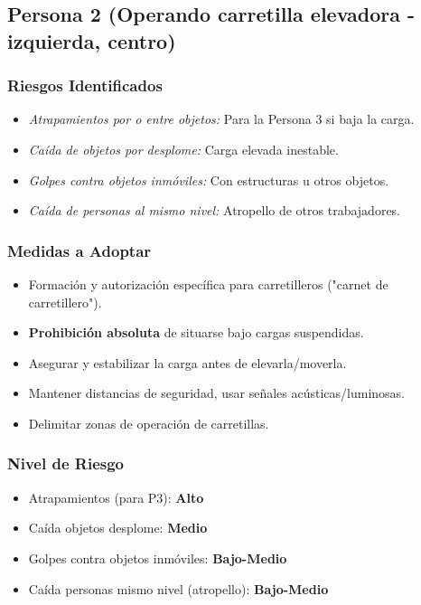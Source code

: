 \documentclass[12pt,a4paper]{article}
\begin{document}
	\bigskip\hrulefill\bigskip
	
	\subsection{Persona 2 (Operando carretilla elevadora - izquierda, centro)}
	
	\subsubsection{Riesgos Identificados}
	\begin{itemize}
		\item \textit{Atrapamientos por o entre objetos:} Para la Persona 3 si baja la carga.
		\item \textit{Caída de objetos por desplome:} Carga elevada inestable.
		\item \textit{Golpes contra objetos inmóviles:} Con estructuras u otros objetos.
		\item \textit{Caída de personas al mismo nivel:} Atropello de otros trabajadores.
	\end{itemize}
	
	\subsubsection{Medidas a Adoptar}
	\begin{itemize}
		\item Formación y autorización específica para carretilleros ("carnet de carretillero").
		\item \textbf{Prohibición absoluta} de situarse bajo cargas suspendidas.
		\item Asegurar y estabilizar la carga antes de elevarla/moverla.
		\item Mantener distancias de seguridad, usar señales acústicas/luminosas.
		\item Delimitar zonas de operación de carretillas.
	\end{itemize}
	
	\subsubsection{Nivel de Riesgo}
	\begin{itemize}
		\item Atrapamientos (para P3): \textbf{Alto}
		\item Caída objetos desplome: \textbf{Medio}
		\item Golpes contra objetos inmóviles: \textbf{Bajo-Medio}
		\item Caída personas mismo nivel (atropello): \textbf{Bajo-Medio}
	\end{itemize}
	
\end{document}
